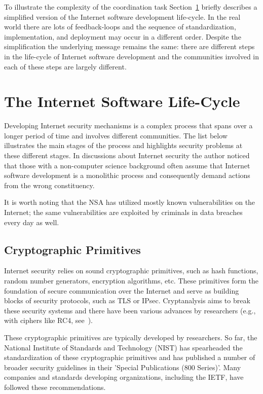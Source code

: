 \documentclass[peerreview, a4paper, 7pt]{IEEEtran}
\begin{document}
To illustrate the complexity of the coordination task Section~\ref{cycle} briefly describes a simplified version of the Internet software development life-cycle. In the real world there are lots of feedback-loops and the sequence of standardization, implementation, and deployment may occur in a different order. Despite the simplification the underlying message remains the same: there are different steps in the life-cycle of Internet software development and the communities involved in each of these steps are largely different.

\section[The Internet Software Life-Cycle]{The Internet Software Life-Cycle}
\label{cycle} 
Developing Internet security mechanisms is a complex process that spans over a longer period of time and involves different communities. The list below illustrates the main stages of the process and highlights security problems at these different stages. In discussions about Internet security the author noticed that those with a non-computer science background often assume that Internet software development is a monolithic process and consequently demand actions from the wrong constituency.

It is worth noting that the NSA has utilized mostly known vulnerabilities on the Internet; the same vulnerabilities are exploited by criminals in data breaches every day as well. 

\subsection{Cryptographic Primitives}

Internet security relies on sound cryptographic primitives, such as hash functions, random number generators, encryption algorithms, etc. These primitives form the foundation of secure communication over the Internet and serve as building blocks of security protocols, such as TLS or IPsec. Cryptanalysis aims to break these security systems and there have been various advances by researchers (e.g., with ciphers like RC4, see~\cite{RC4, RC4-TLS}).

These cryptographic primitives are typically developed by researchers. So far, the National Institute of Standards and Technology (NIST) has spearheaded the standardization of these cryptographic primitives and has published a number of broader security guidelines in their 'Special Publications (800 Series)'. Many companies and standards developing organizations, including the IETF, have followed these recommendations.
\end{document}
